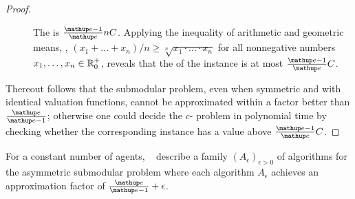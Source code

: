 \begin{proof}
\begin{description}
		\item[\No]
		The \SW{} is \(\frac{\euler - 1}{\euler} n \swconstant\).
		Applying the inequality of arithmetic and geometric means, \ie{}, \((x_1 + \dots + x_n)/n \ge \sqrt[n]{x_1 \cdot \dots \cdot x_n}\) for all nonnegative numbers \(x_1, \dots, x_n \in \realposzero\), reveals that the \NSW{} of the instance is at most \(\frac{\euler - 1}{\euler} \swconstant\).
	\end{description}
	Thereout follows that the submodular \NSW{} problem, even when symmetric and with identical valuation functions, cannot be approximated within a factor better than \(\frac{\euler}{\euler - 1}\);
	otherwise one could decide the \(c\)-\Gap{} problem in polynomial time by checking whether the corresponding \NSW{} instance has a value above \(\frac{\euler - 1}{\euler} \swconstant\).
\end{proof}

For a constant number of agents, \citeauthor{APNSWuSVþUM}~\cite[Section 5.1]{APNSWuSVþUM} describe a family \((A_{\epsilon})_{\epsilon > 0}\) of algorithms for the asymmetric submodular \NSW{} problem where each algorithm \(A_\epsilon\) achieves an approximation factor of \(\frac{\euler}{\euler - 1} + \epsilon\).

